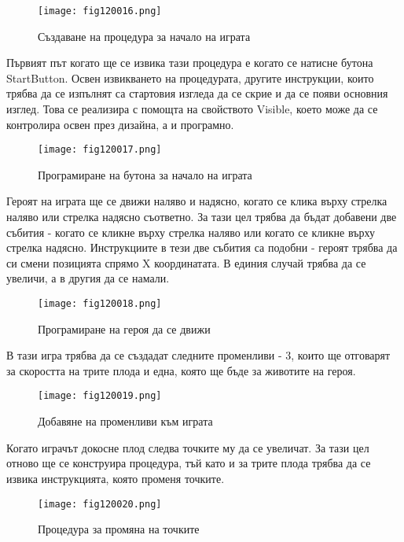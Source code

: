 \begin{figure}[H]
  \centering
  \texttt{[image: fig120016.png]}
  \caption{Създаване на процедура за начало на играта}
\label{fig120016}
\end{figure}

Първият път когато ще се извика тази процедура е когато се натисне бутона StartButton. Освен извикването на процедурата, другите инструкции, които трябва да се изпълнят са стартовия изгледа да се скрие и да се появи основния изглед. Това се реализира с помощта на свойството Visible, което може да се контролира освен през дизайна, а и програмно.

\begin{figure}[H]
  \centering
  \texttt{[image: fig120017.png]}
  \caption{Програмиране на бутона за начало на играта}
\label{fig120017}
\end{figure}

Героят на играта ще се движи наляво и надясно, когато се клика върху стрелка наляво или стрелка надясно съответно. За тази цел трябва да бъдат добавени две събития - когато се кликне върху стрелка наляво или когато се кликне върху стрелка надясно. Инструкциите в тези две събития са подобни - героят трябва да си смени позицията спрямо X координатата. В единия случай трябва да се увеличи, а в другия да се намали.

\begin{figure}[H]
  \centering
  \texttt{[image: fig120018.png]}
  \caption{Програмиране на героя да се движи}
\label{fig120018}
\end{figure}

В тази игра трябва да се създадат следните променливи - 3, които ще отговарят за скоростта на трите плода и една, която ще бъде за животите на героя.

\begin{figure}[H]
  \centering
  \texttt{[image: fig120019.png]}
  \caption{Добавяне на променливи към играта}
\label{fig120019}
\end{figure}

Когато играчът докосне плод следва точките му да се увеличат. За тази цел отново ще се конструира процедура, тъй като и за трите плода трябва да се извика инструкцията, която променя точките.

\begin{figure}[H]
  \centering
  \texttt{[image: fig120020.png]}
  \caption{Процедура за промяна на точките}
\label{fig120020}
\end{figure}

